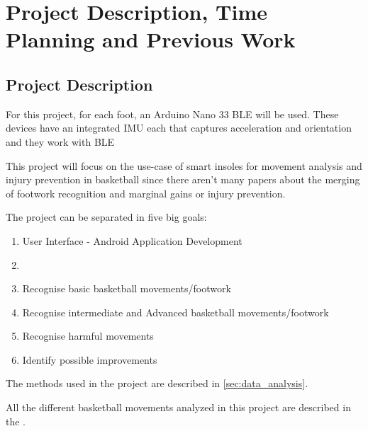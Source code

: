 
%



\chapter{Project Description, Time Planning and Previous Work}
\label{cha:projectDescription}


\section{Project Description}
\label{sec:project_description}

For this project, for each foot, an Arduino Nano 33 BLE will be used. These devices have an integrated IMU each that captures acceleration and orientation and they work with BLE %

This project will focus on the use-case of smart insoles for movement analysis and injury prevention in basketball since there aren't many papers about the 
merging of footwork recognition and marginal gains or injury prevention.


The project can be separated in five big goals:

\begin{enumerate}
    \item User Interface - Android Application Development
    \item \item Recognise basic basketball movements/footwork
    \item Recognise intermediate and Advanced basketball movements/footwork
    \item Recognise harmful movements
    \item Identify possible improvements
\end{enumerate}

The methods used in the project are described in \autoref{sec:data_analysis}.

All the different basketball movements analyzed in this project are described in the .

